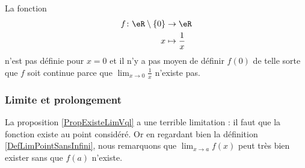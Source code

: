 \begin{example}
    La fonction
    \begin{equation}
        \begin{aligned}
            f\colon \eR\setminus\{ 0 \}&\to \eR \\
            x&\mapsto \frac{1}{ x } 
        \end{aligned}
    \end{equation}
    n'est pas définie pour \( x=0\) et il n'y a pas moyen de définir \( f(0)\) de telle sorte que \( f\) soit continue parce que \( \lim_{x\to 0} \frac{1}{ x }\) n'existe pas.
\end{example}

\subsubsection{Limite et prolongement}

La proposition \ref{PropExisteLimVql} a une terrible limitation : il faut que la fonction existe au point considéré. Or en regardant bien la définition \ref{DefLimPointSansInfini}, nous remarquons que $\lim_{x\to a}f(x)$ peut très bien exister sans que $f(a)$ n'existe.

